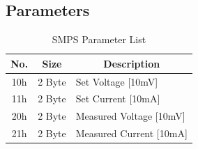 \subsection{Parameters}
\begin{table}[H]
    \centering
    \begin{tabular}{|c|c|l|}
        \hline
        \textbf{No.}   &   \textbf{Size} & \multicolumn{1}{|c|}{\textbf{Description}}\\ \hline \hline
        10h   &  2 Byte &  Set Voltage [10mV]\\ \hline
		11h   &  2 Byte &  Set Current [10mA]\\ \hline
		20h   &  2 Byte &  Measured Voltage [10mV]\\ \hline
		21h   &  2 Byte &  Measured Current [10mA]\\ \hline
    \end{tabular}
	\caption{SMPS Parameter List}
\label{tab:Par-SMPS}
\end{table}